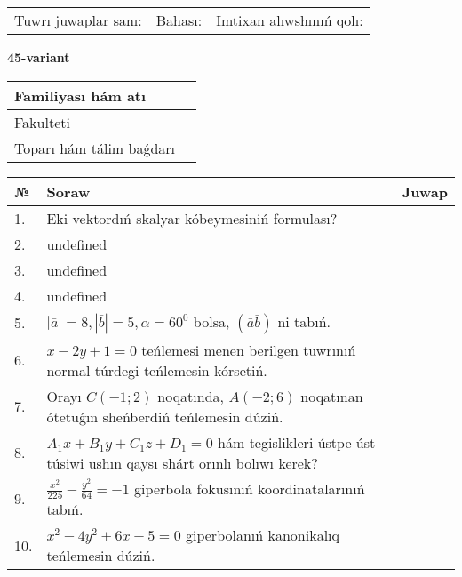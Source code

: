 \documentclass{article}
\begin{document}
\vspace{0.7cm}

\begin{tabular}{lll}
Tuwrı juwaplar sanı: \underline{\hspace{1cm}} & 
Bahası: \underline{\hspace{1cm}} & 
Imtixan alıwshınıń qolı: \underline{\hspace{2cm}} \\
\end{tabular}

\egroup

\newpage


\textbf{45-variant}\\

\bgroup
\def\arraystretch{1.6} %

\begin{tabular}{|m{5.7cm}|m{9.5cm}|}
\hline
Familiyası hám atı & \\
\hline
Fakulteti  & \\
\hline
Toparı hám tálim baǵdarı  & \\
\hline
\end{tabular}

\vspace{0.7cm}

\begin{tabular}{|m{0.7cm}|m{10cm}|m{4cm}|}
\hline
№ & Soraw & Juwap \\
\hline
1. & Eki vektordıń skalyar kóbeymesiniń formulası? &  \\
\hline
2. & undefined &  \\
\hline
3. & undefined &  \\
\hline
4. & undefined &  \\
\hline
5. & \(\left| \bar{a} \right| = 8, \left| \bar{b} \right| = 5, \alpha = 60^{0}\) bolsa, \(( \bar{a}\bar{b} )\) ni tabıń. &  \\
\hline
6. & \(x - 2 y + 1 = 0\) teńlemesi menen berilgen tuwrınıń normal túrdegi teńlemesin kórsetiń. &  \\
\hline
7. & Orayı \(C (- 1;2)\) noqatında, \(A (- 2;6 )\) noqatınan ótetuǵın sheńberdiń teńlemesin dúziń. &  \\
\hline
8. & \(A_{1}x + B_{1}y + C_{1}z + D_{1} = 0\) hám tegislikleri ústpe-úst túsiwi ushın qaysı shárt orınlı bolıwı kerek? &  \\
\hline
9. & \(\frac{x^{2}}{225} - \frac{y^{2}}{64} = - 1\) giperbola fokusınıń koordinatalarınıń tabıń. &  \\
\hline
10. & \(x^{2} - 4 y^{2} + 6 x + 5 = 0\) giperbolanıń kanonikalıq teńlemesin dúziń. & \\
\hline
\end{tabular}
\end{document}
